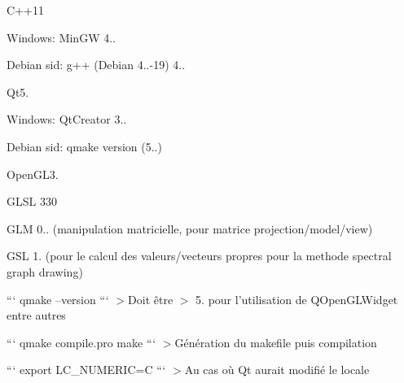 
\begin{DoxyItemize}
\item C++11
\begin{DoxyItemize}
\item Windows\+: {\ttfamily Min\+G\+W 4..}
\item Debian sid\+: {\ttfamily g++ (Debian 4..-\/19) 4..}
\end{DoxyItemize}
\item Qt5.
\begin{DoxyItemize}
\item Windows\+: {\ttfamily Qt\+Creator 3..}
\item Debian sid\+: {\ttfamily qmake version (5..)}
\end{DoxyItemize}
\item Open\+G\+L3.
\begin{DoxyItemize}
\item {\ttfamily G\+L\+S\+L 330}
\end{DoxyItemize}
\item G\+L\+M 0.. (manipulation matricielle, pour matrice projection/model/view)
\item G\+S\+L 1. (pour le calcul des valeurs/vecteurs propres pour la methode spectral graph drawing) 

 ``` qmake --version ``` $>$Doit être $>$ 5. pour l'utilisation de Q\+Open\+G\+L\+Widget entre autres 

 ``` qmake compile.\+pro make ``` $>$Génération du makefile puis compilation 

 ``` export L\+C\+\_\+\+N\+U\+M\+E\+R\+I\+C=C ``` $>$Au cas où Qt aurait modifié le locale 

 
\end{DoxyItemize}